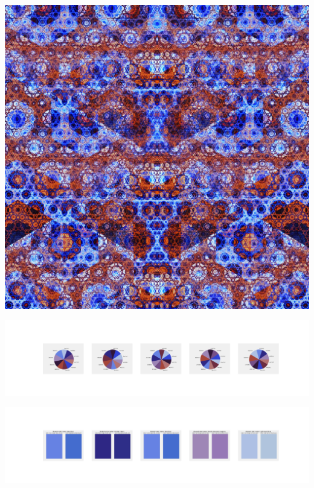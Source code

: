\documentclass[11pt]{article}
\begin{document}
\begin{landscape}
    \begin{center}
    \includegraphics[width=\textwidth]{./nbimg/file (285).jpg}
    \end{center}

    \begin{center}
    \includegraphics[width=250mm]{./nbimg/pie-206.jpg}
    \end{center}

    \begin{center}
    \includegraphics[width=250mm]{./nbimg/peak-206.jpg}
    \end{center}
    


\end{landscape}
\end{document}
